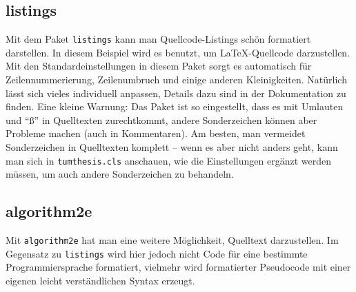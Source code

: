 \subsection{listings}
\label{sec:intro:listings}
Mit dem Paket \texttt{listings} kann man Quellcode-Listings schön formatiert
darstellen. In diesem Beispiel wird es benutzt, um \LaTeX-Quellcode
darzustellen. Mit den Standardeinstellungen in diesem Paket sorgt es automatisch
für Zeilennummerierung, Zeilenumbruch und einige anderen
Kleinigkeiten. Natürlich lässt sich vieles individuell anpassen, Details dazu
sind in der Dokumentation \cite{listings} zu finden. Eine kleine Warnung: Das
Paket ist so eingestellt, dass es mit Umlauten und \enquote{ß} in Quelltexten
zurechtkommt, andere Sonderzeichen können aber Probleme machen  (auch in
Kommentaren). Am besten, man vermeidet Sonderzeichen in Quelltexten komplett --
wenn es aber nicht anders geht, kann man sich in \texttt{tumthesis.cls}
anschauen, wie die Einstellungen ergänzt werden müssen, um auch andere
Sonderzeichen zu behandeln.

\subsection{algorithm2e}
\label{sec:intro:algorithm2e}
Mit \texttt{algorithm2e} hat man eine weitere Möglichkeit, Quelltext darzustellen. 
Im Gegensatz zu \texttt{listings} wird hier jedoch nicht Code für eine bestimmte
Programmiersprache formatiert, vielmehr wird formatierter Pseudocode mit
einer eigenen leicht verständlichen Syntax erzeugt.


